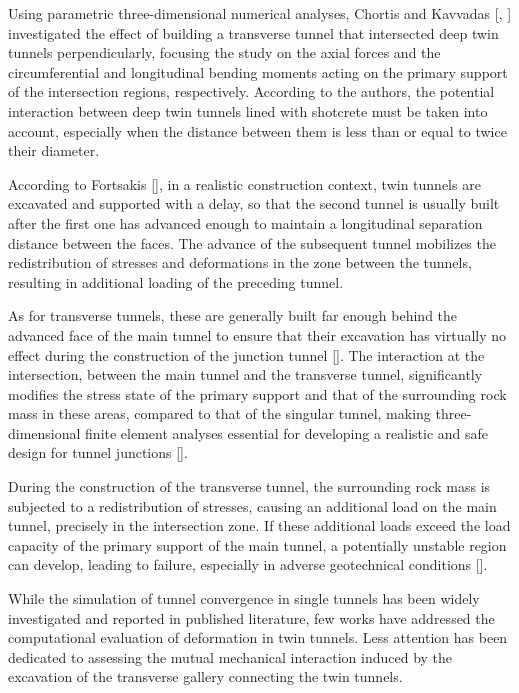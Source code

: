 \documentclass[a4paper,fleqn]{cas-sc}
\begin{document}
Using parametric three-dimensional numerical analyses, Chortis and Kavvadas [, ] investigated the effect of building a transverse tunnel that intersected deep twin tunnels perpendicularly, focusing the study on the axial forces and the circumferential and longitudinal bending moments acting on the primary support of the intersection regions, respectively. According to the authors, the potential interaction between deep twin tunnels lined with shotcrete must be taken into account, especially when the distance between them is less than or equal to twice their diameter.

According to Fortsakis [], in a realistic construction context, twin tunnels are excavated and supported with a delay, so that the second tunnel is usually built after the first one has advanced enough to maintain a longitudinal separation distance between the faces. The advance of the subsequent tunnel mobilizes the redistribution of stresses and deformations in the zone between the tunnels, resulting in additional loading of the preceding tunnel.

As for transverse tunnels, these are generally built far enough behind the advanced face of the main tunnel to ensure that their excavation has virtually no effect during the construction of the junction tunnel []. The interaction at the intersection, between the main tunnel and the transverse tunnel, significantly modifies the stress state of the primary support and that of the surrounding rock mass in these areas, compared to that of the singular tunnel, making three-dimensional finite element analyses essential for developing a realistic and safe design for tunnel junctions [].

During the construction of the transverse tunnel, the surrounding rock mass is subjected to a redistribution of stresses, causing an additional load on the main tunnel, precisely in the intersection zone. If these additional loads exceed the load capacity of the primary support of the main tunnel, a potentially unstable region can develop, leading to failure, especially in adverse geotechnical conditions [].

While the simulation of tunnel convergence in single tunnels has been widely investigated and reported in published literature, few works have addressed the computational evaluation of deformation in twin tunnels. Less attention has been dedicated to assessing the mutual mechanical interaction induced by the excavation of the transverse gallery connecting the twin tunnels. 
\end{document}
